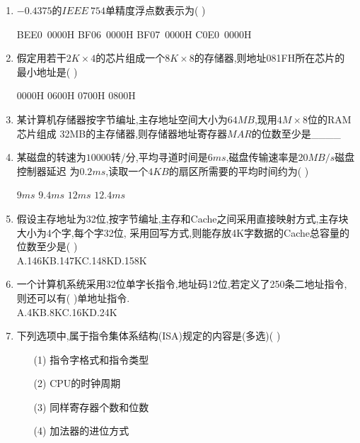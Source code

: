 \documentclass[12pt, a4paper, oneside, UTF8]{ctexbook}
\begin{document}
\begin{enumerate}
    \item \bl $-0.4375$的$IEEE\ 754$单精度浮点数表示为(    ) 
    \begin{choices}
        \task BEE0\ 0000H \task BF06\ 0000H \task BF07\ 0000H \task C0E0\ 0000H
    \end{choices}

    \item \bt 假定用若干$2K\times 4$的芯片组成一个$8K\times 8$的存储器,则地址081FH所在芯片的
    最小地址是(    ) 
    \begin{choices}
        \task 0000H
        \task 0600H
        \task 0700H
        \task 0800H
    \end{choices}
    

    \item \bt 某计算机存储器按字节编址,主存地址空间大小为$64MB$,现用$4M\times 8$位的RAM芯片组成
    32MB的主存储器,则存储器地址寄存器$MAR$的位数至少是\_\_\_\_ 

    \item \bt 某磁盘的转速为$10000$转/分,平均寻道时间是$6ms$,磁盘传输速率是$20MB/s$磁盘控制器延迟
    为$0.2ms$,读取一个$4KB$的扇区所需要的平均时间约为(   ) 
    \begin{choices}
        \task $9ms$
        \task $9.4ms$
        \task $12ms$
        \task $12.4ms$
    \end{choices}
    

    \item \bt 假设主存地址为32位,按字节编址,主存和Cache之间采用直接映射方式,主存块大小为4个字,每个字32位,
    采用回写方式,则能存放4K字数据的Cache总容量的位数至少是(   ) \\
    A.146K\qquad B.147K\qquad C.148K\qquad D.158K 

    \item \bl 一个计算机系统采用32位单字长指令,地址码12位,若定义了250条二地址指令,则还可以有(   )单地址指令. \\
    A.4K\qquad B.8K\qquad C.16K\qquad D.24K 

    \item \bt 下列选项中,属于指令集体系结构(ISA)规定的内容是(多选)(    )
    \begin{enumerate}
        \item [(1)] 指令字格式和指令类型 
        \item [(2)] CPU的时钟周期 
        \item [(3)] 同样寄存器个数和位数 
        \item [(4)] 加法器的进位方式
    \end{enumerate}


\end{enumerate}
\end{document}
